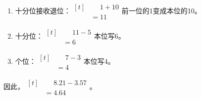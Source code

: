 {\begin{enumerate}[leftmargin=1.7em,itemsep=5pt,topsep=0pt]
\item 十分位接收退位：\(\begin{aligned}[t]&\phantom{={}}1+10\\&=11\end{aligned}\)\quad 前一位的1变成本位的10。
\item 十分位：\(\begin{aligned}[t]&\phantom{={}}11-5\\&=6\end{aligned}\)\quad 本位写6。
\item 个位：\(\begin{aligned}[t]&\phantom{={}}7-3\\&=4\end{aligned}\)\quad 本位写4。
\end{enumerate}
\par\smallskip
因此，\(\begin{aligned}[t]&\phantom{={}}8.21-3.57\\&=4.64\end{aligned}\)。
\par\medskip

}
